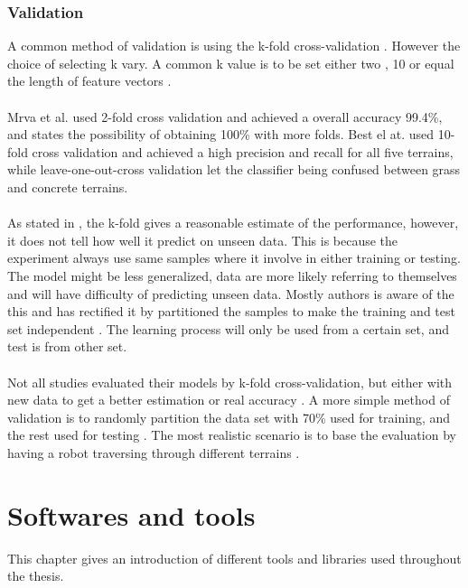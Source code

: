 \documentclass[USenglish]{ifimaster}  %
\begin{document}
\subsection{Validation}\label{subseq:validation}
A common method of validation is using the k-fold cross-validation \cite{DBLP:conf/itat/MrvaF15,6784609,6386243,Hoffmann20141790,6849778,7387710}. However the choice of selecting k vary. A common k value is to be set either two \cite{DBLP:conf/itat/MrvaF15,6784609}, 10 \cite{26b23e912c654fe4b7478fd910130195,6386243,Hoffmann20141790,6849778,7387710} or equal the length of feature vectors \cite{26b23e912c654fe4b7478fd910130195}.
\\
\\
Mrva et al. \cite{DBLP:conf/itat/MrvaF15} used 2-fold cross validation and achieved a overall accuracy 99.4\%, and states the possibility of obtaining 100\% with more folds. Best el at. \cite{26b23e912c654fe4b7478fd910130195} used 10-fold cross validation and achieved a high precision and recall for all five terrains, while leave-one-out-cross validation let the classifier being confused between grass and concrete terrains. 
\\
\\
As stated in \cite{7387710}, the k-fold gives a reasonable estimate of the performance, however, it does not tell how well it predict on unseen data. This is because the experiment always use same samples where it involve in either training or testing. The model might be less generalized, data are more likely referring to themselves and will have difficulty of predicting unseen data. Mostly authors is aware of the this and has rectified it by partitioned the samples to make the training and test set independent \cite{26b23e912c654fe4b7478fd910130195}. The learning process will only be used from a certain set, and test is from other set.
\\
\\
Not all studies evaluated their models by k-fold cross-validation, but either with new data to get a better estimation or real accuracy \cite{5509309,Walas2015,5752869}. A more simple method of validation is to randomly partition the data set with 70\% used for training, and the rest used for testing \cite{5752869}. The most realistic scenario is to base the evaluation by having a robot traversing through different terrains \cite{DBLP:conf/itat/MrvaF15}.


\chapter{Softwares and tools} \label{chap:software}
This chapter gives an introduction of different tools and libraries used throughout the thesis.
\end{document}
